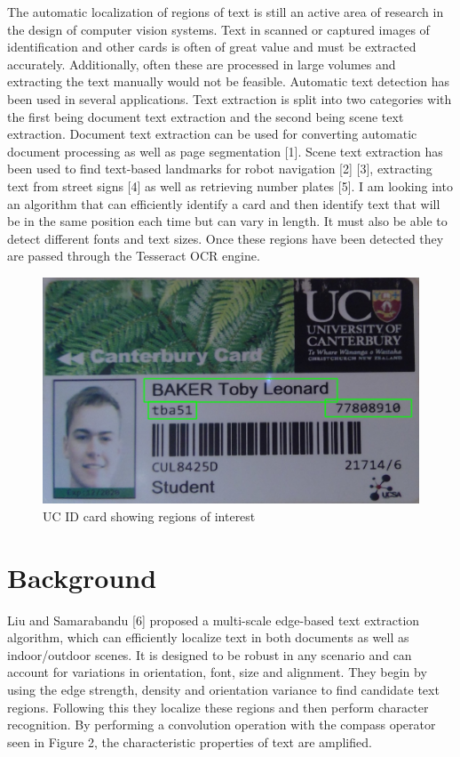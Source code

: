 \documentclass[12pt,a4paper,notitlepage]{IEEEtran}
\begin{document}
The automatic localization of regions of text is still an active area of research in the design of computer vision systems. Text in scanned or captured images of identification and other cards is often of great value and must be extracted accurately. Additionally, often these are processed in large volumes and extracting the text manually would not be feasible. 
Automatic text detection has been used in several applications. Text extraction is split into two categories with the first being document text extraction and the second being scene text extraction. Document text extraction can be used for converting automatic document processing as well as page segmentation [1]. Scene text extraction has been used to find text-based landmarks for robot navigation [2] [3], extracting text from street signs [4] as well as retrieving number plates [5].
I am looking into an algorithm that can efficiently identify a card and then identify text that will be in the same position each time but can vary in length. It must also be able to detect different fonts and text sizes. Once these regions have been detected they are passed through the Tesseract OCR engine.
	\begin{figure}
  		\includegraphics[width=\linewidth]{ID-Bounding-Box.jpg}
  		\caption{UC ID card showing regions of interest}
  		\label{fig:BoundingID}
	\end{figure}	

	\section{Background}

Liu and Samarabandu [6] proposed a multi-scale edge-based text extraction algorithm, which can efficiently localize text in both documents as well as indoor/outdoor scenes. It is designed to be robust in any scenario and can account for variations in orientation, font, size and alignment. They begin by using the edge strength, density and orientation variance to find candidate text regions. Following this they localize these regions and then perform character recognition. By performing a convolution operation with the compass operator seen in Figure 2, the characteristic properties of text are amplified. 
\end{document}
